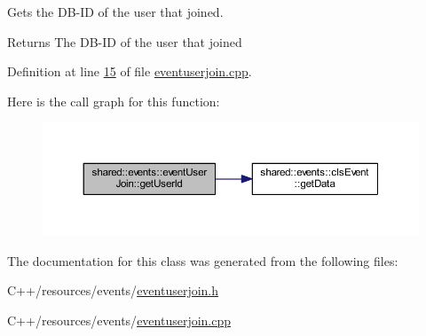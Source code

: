 Gets the D\-B-\/\-I\-D of the user that joined. 

\begin{DoxyReturn}{Returns}
The D\-B-\/\-I\-D of the user that joined 
\end{DoxyReturn}


Definition at line \hyperlink{eventuserjoin_8cpp_source_l00015}{15} of file \hyperlink{eventuserjoin_8cpp_source}{eventuserjoin.\-cpp}.



Here is the call graph for this function\-:\nopagebreak
\begin{figure}[H]
\begin{center}
\leavevmode
\includegraphics[width=350pt]{dd/d05/classshared_1_1events_1_1event_user_join_ab1386fad8a4b2bb51e62589565090d5a_cgraph}
\end{center}
\end{figure}




The documentation for this class was generated from the following files\-:\begin{DoxyCompactItemize}
\item 
C++/resources/events/\hyperlink{eventuserjoin_8h}{eventuserjoin.\-h}\item 
C++/resources/events/\hyperlink{eventuserjoin_8cpp}{eventuserjoin.\-cpp}\end{DoxyCompactItemize}
